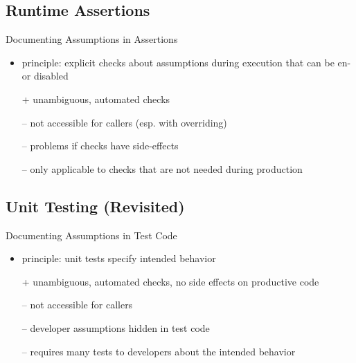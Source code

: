 \subsection{Runtime Assertions}
\begin{frame}{\insertsubsection}
	\begin{fancycolumns}
		\begin{exampletight}{Documenting Assumptions in Assertions}
			\centering\makebox{\usebox{\runtimeassertions}}
		\end{exampletight}
		\nextcolumn
		\begin{definition}{\insertsubsection}
			\begin{itemize}
				\item principle: explicit checks about assumptions during execution that can be en- or disabled
				\item[+] unambiguous, automated checks
				\item[--] not accessible for callers (esp. with overriding)
				\item[--] problems if checks have side-effects
				\item[--] only applicable to checks that are not needed during production
			\end{itemize}
		\end{definition}
	\end{fancycolumns}
\end{frame}

\subsection{Unit Testing (Revisited)}
\begin{frame}{\insertsubsection}
	\begin{fancycolumns}
		\begin{exampletight}{Documenting Assumptions in Test Code}
			\centering\makebox{\usebox{\unittests}}
		\end{exampletight}
		\nextcolumn
		\begin{definition}{\insertsubsection}
			\begin{itemize}
				\item principle: unit tests specify intended behavior
				\item[+] unambiguous, automated checks, no side effects on productive code
				\item[--] not accessible for callers
				\item[--] developer assumptions hidden in test code
				\item[--] requires many tests to  developers about the intended behavior
			\end{itemize}
		\end{definition}
	\end{fancycolumns}
\end{frame}

